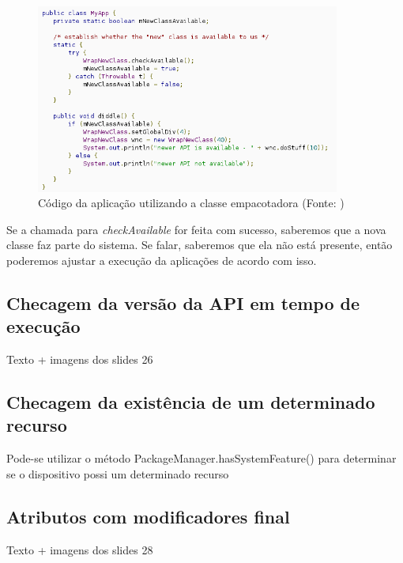 \begin{figure}[h]
    \centering
    \includegraphics[width=10cm]{img/wrapper3}
    \caption[Código da aplicação utilizando a classe empacotadora]{Código da aplicação utilizando a classe empacotadora (Fonte: \cite{back_compat})}
    \label{wrapper3}
\end{figure}

Se a chamada para {\it checkAvailable} for feita com sucesso, saberemos que a nova
classe faz parte do sistema. Se falar, saberemos que ela não está presente, então
poderemos ajustar a execução da aplicações de acordo com isso.

\subsection{Checagem da versão da API em tempo de execução}

Texto + imagens dos slides 26

\subsection{Checagem da existência de um determinado recurso}
Pode-se utilizar o método PackageManager.hasSystemFeature() para determinar se o 
dispositivo possi um determinado recurso

\subsection{Atributos com modificadores final}

Texto + imagens dos slides 28


